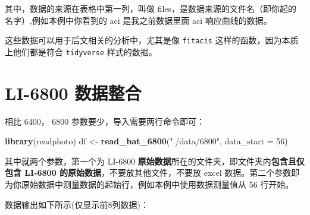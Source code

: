 \documentclass[
]{krantz}
\makeatletter
\newenvironment{Shaded}{\begin{snugshade}}{\end{snugshade}}
\newcommand{\DataTypeTok}[1]{\textcolor[rgb]{0.13,0.29,0.53}{#1}}
\newcommand{\DecValTok}[1]{\textcolor[rgb]{0.00,0.00,0.81}{#1}}
\newcommand{\KeywordTok}[1]{\textcolor[rgb]{0.13,0.29,0.53}{\textbf{#1}}}
\newcommand{\NormalTok}[1]{#1}
\newcommand{\StringTok}[1]{\textcolor[rgb]{0.31,0.60,0.02}{#1}}
\newenvironment{kframe}{%
\medskip{}
\setlength{\fboxsep}{.8em}
 \def\at@end@of@kframe{}%
 \ifinner\ifhmode%
  \def\at@end@of@kframe{\end{minipage}}%
  \begin{minipage}{\columnwidth}%
 \fi\fi%
 \def\FrameCommand##1{\hskip\@totalleftmargin \hskip-\fboxsep
 \colorbox{shadecolor}{##1}\hskip-\fboxsep
     \hskip-\linewidth \hskip-\@totalleftmargin \hskip\columnwidth}%
 \MakeFramed {\advance\hsize-\width
   \@totalleftmargin\z@ \linewidth\hsize
   \@setminipage}}%
 {\par\unskip\endMakeFramed%
 \at@end@of@kframe}
\renewenvironment{Shaded}{\begin{kframe}}{\end{kframe}}
\makeatother
\begin{document}
其中，数据的来源在表格中第一列，叫做 files，是数据来源的文件名（即你起的名字）,例如本例中你看到的 aci 是我之前数据里面 aci 响应曲线的数据。

这些数据可以用于后文相关的分析中，尤其是像 \texttt{fitacis} 这样的函数，因为本质上他们都是符合 \texttt{tidyverse} 样式的数据。

\hypertarget{batch68}{%
\section{LI-6800 数据整合}\label{batch68}}

相比 6400， 6800 参数要少，导入需要两行命令即可：

\begin{Shaded}
\begin{Highlighting}[]
\KeywordTok{library}\NormalTok{(readphoto)}
\NormalTok{df <-}\StringTok{ }\KeywordTok{read_bat_6800}\NormalTok{(}\StringTok{"./data/6800"}\NormalTok{, }\DataTypeTok{data_start =} \DecValTok{56}\NormalTok{)}
\end{Highlighting}
\end{Shaded}

其中就两个参数，第一个为 LI-6800 \textbf{原始数据}所在的文件夹，即文件夹内\textbf{包含且仅包含 LI-6800 的原始数据}，不要放其他文件，不要放 excel 数据。第二个参数即为你原始数据中测量数据的起始行，例如本例中使用数据测量值从 56 行开始。

数据输出如下所示(仅显示前8列数据)：
\end{document}
